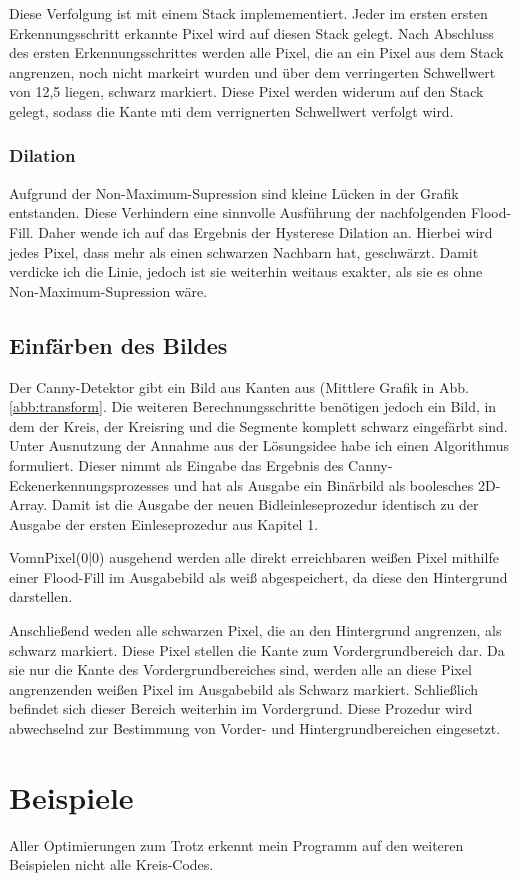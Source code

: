 Diese Verfolgung ist mit einem Stack implemementiert. Jeder im ersten ersten Erkennungsschritt erkannte Pixel wird auf diesen Stack gelegt. Nach Abschluss des ersten Erkennungsschrittes werden alle Pixel, die an ein Pixel aus dem Stack angrenzen, noch nicht markeirt wurden und über dem verringerten Schwellwert von 12,5 liegen, schwarz markiert. Diese Pixel werden widerum auf den Stack gelegt, sodass die Kante mti dem verrignerten Schwellwert verfolgt wird. 

\subsubsection{Dilation}
Aufgrund der Non-Maximum-Supression sind kleine Lücken in der Grafik entstanden. Diese Verhindern eine sinnvolle Ausführung der nachfolgenden Flood-Fill. Daher wende ich auf das Ergebnis der Hysterese Dilation an. Hierbei wird jedes Pixel, dass mehr als einen schwarzen Nachbarn hat, geschwärzt.
Damit verdicke ich die Linie, jedoch ist sie weiterhin weitaus exakter, als sie es ohne Non-Maximum-Supression wäre.

\subsection{Einfärben des Bildes}
Der Canny-Detektor gibt ein Bild aus Kanten aus (Mittlere Grafik in Abb. \ref{abb:transform}. Die weiteren Berechnungsschritte benötigen jedoch ein Bild, in dem der Kreis, der Kreisring und die Segmente komplett schwarz eingefärbt sind. Unter Ausnutzung der Annahme aus der Lösungsidee habe ich einen Algorithmus formuliert.
Dieser nimmt als Eingabe das Ergebnis des Canny-Eckenerkennungsprozesses und hat als Ausgabe ein Binärbild als boolesches 2D-Array. Damit ist die Ausgabe der neuen Bidleinleseprozedur identisch zu der Ausgabe der ersten Einleseprozedur aus Kapitel 1.

VomnPixel(0|0) ausgehend werden alle direkt erreichbaren weißen Pixel mithilfe einer Flood-Fill im Ausgabebild als weiß abgespeichert, da diese den Hintergrund darstellen.

Anschließend weden alle schwarzen Pixel, die an den Hintergrund angrenzen, als schwarz markiert. Diese Pixel stellen die Kante zum Vordergrundbereich dar. Da sie nur die Kante des Vordergrundbereiches sind, werden alle an diese Pixel angrenzenden weißen Pixel im Ausgabebild als Schwarz markiert. Schließlich befindet sich dieser Bereich weiterhin im Vordergrund.
Diese Prozedur wird abwechselnd zur Bestimmung von Vorder- und Hintergrundbereichen eingesetzt.

\section{Beispiele}
Aller Optimierungen zum Trotz erkennt mein Programm auf den weiteren Beispielen nicht alle Kreis-Codes.